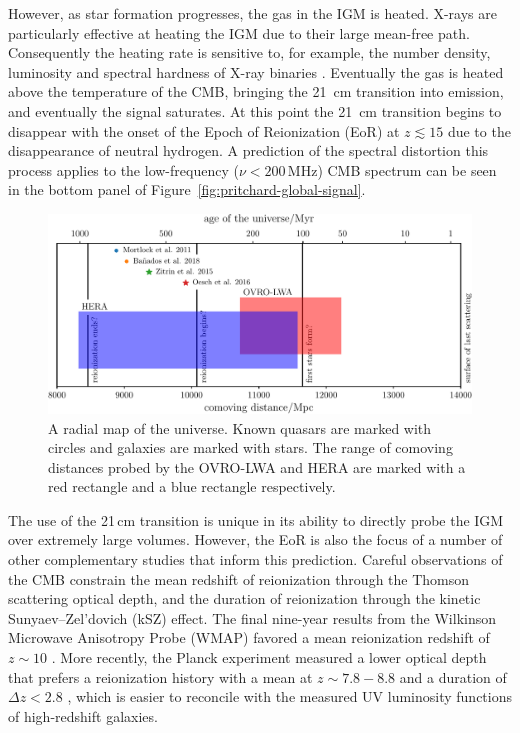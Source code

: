 \begin{bibunit}
However, as star formation progresses, the gas in the IGM is heated. X-rays are particularly
effective at heating the IGM due to their large mean-free path. Consequently the heating rate is
sensitive to, for example, the number density, luminosity and spectral hardness of X-ray binaries
\citep{2014MNRAS.437L..36F,2017MNRAS.472.2651G}.  Eventually the gas is heated above the temperature
of the CMB, bringing the 21~cm transition into emission, and eventually the signal saturates. At
this point the 21~cm transition begins to disappear with the onset of the Epoch of Reionization
(EoR) at $z \lesssim 15$ due to the disappearance of neutral hydrogen. A prediction of the spectral
distortion this process applies to the low-frequency ($\nu < 200\,\text{MHz}$) CMB spectrum can be
seen in the bottom panel of Figure~\ref{fig:pritchard-global-signal}.

\begin{figure}[t]
    \centering
    \includegraphics[width=\textwidth]{figures/chapter1/history-of-the-universe/history-of-the-universe}
    \caption{
        A radial map of the universe. Known quasars are marked with circles and galaxies are marked
        with stars. The range of comoving distances probed by the OVRO-LWA and HERA are marked with
        a red rectangle and a blue rectangle respectively.
    }
    \label{fig:history-of-the-universe}
\end{figure}

The use of the 21\,cm transition is unique in its ability to directly probe the IGM over extremely
large volumes. However, the EoR is also the focus of a number of other complementary studies that
inform this prediction. Careful observations of the CMB constrain the mean redshift of reionization
through the Thomson scattering optical depth, and the duration of reionization through the kinetic
Sunyaev--Zel'dovich (kSZ) effect. The final nine-year results from the Wilkinson Microwave
Anisotropy Probe (WMAP) favored a mean reionization redshift of $z\sim10$
\citep{2013ApJS..208...19H}. More recently, the Planck experiment measured a lower optical depth
that prefers a reionization history with a mean at $z\sim7.8-8.8$ and a duration of $\Delta z < 2.8$
\citep{2016A&A...596A.108P}, which is easier to reconcile with the measured UV luminosity functions
of high-redshift galaxies.


\end{bibunit}
